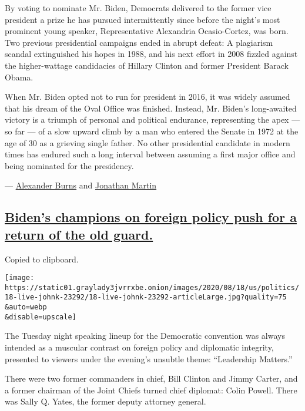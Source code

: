 By voting to nominate Mr. Biden, Democrats delivered to the former vice
president a prize he has pursued intermittently since before the night's
most prominent young speaker, Representative Alexandria Ocasio-Cortez,
was born. Two previous presidential campaigns ended in abrupt defeat: A
plagiarism scandal extinguished his hopes in 1988, and his next effort
in 2008 fizzled against the higher-wattage candidacies of Hillary
Clinton and former President Barack Obama.

When Mr. Biden opted not to run for president in 2016, it was widely
assumed that his dream of the Oval Office was finished. Instead, Mr.
Biden's long-awaited victory is a triumph of personal and political
endurance, representing the apex --- so far --- of a slow upward climb
by a man who entered the Senate in 1972 at the age of 30 as a grieving
single father. No other presidential candidate in modern times has
endured such a long interval between assuming a first major office and
being nominated for the presidency.

---
\href{https://www.nytimes3xbfgragh.onion/by/alexander-burns}{Alexander
Burns} and
\href{https://www.nytimes3xbfgragh.onion/by/jonathan-martin}{Jonathan
Martin}

\hypertarget{bidens-champions-on-foreign-policy-push-for-a-return-of-the-old-guard}{%
\subsection{\texorpdfstring{\protect\hyperlink{bidens-champions-on-foreign-policy-push-for-a-return-of-the-old-guard}{Biden's
champions on foreign policy push for a return of the old
guard.}}{Biden's champions on foreign policy push for a return of the old guard.}}\label{bidens-champions-on-foreign-policy-push-for-a-return-of-the-old-guard}}

Copied to clipboard.

\texttt{[image: https://static01.graylady3jvrrxbe.onion/images/2020/08/18/us/politics/18-live-johnk-23292/18-live-johnk-23292-articleLarge.jpg?quality=75\\\&auto=webp\\\&disable=upscale]}

The Tuesday night speaking lineup for the Democratic convention was
always intended as a muscular contrast on foreign policy and diplomatic
integrity, presented to viewers under the evening's unsubtle theme:
``Leadership Matters.''

There were two former commanders in chief, Bill Clinton and Jimmy
Carter, and a former chairman of the Joint Chiefs turned chief diplomat:
Colin Powell. There was Sally Q. Yates, the former deputy attorney
general.

